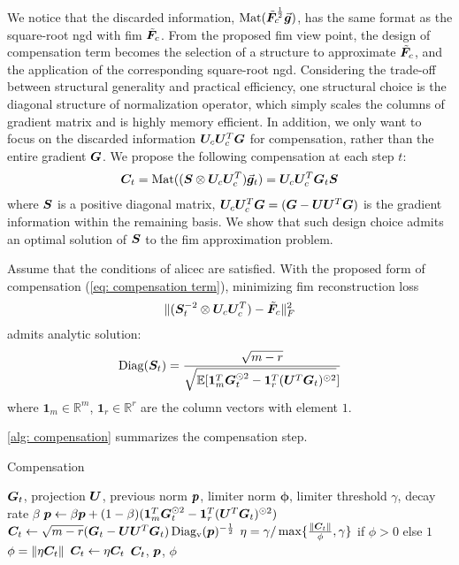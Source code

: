 We notice that the discarded information, $\operatorname{Mat}(\tilde{\bm{F}}_c^{\frac{1}{2}}\vec{\bm{g}})$, has the same format as the square-root \gls{ngd} with \gls{fim} $\tilde{\bm{F}}_c$. From the proposed \gls{fim} view point, the design of compensation term becomes the selection of a structure to approximate $\tilde{\bm{F}}_c$, and the application of the corresponding square-root \gls{ngd}. Considering the trade-off between structural generality and practical efficiency, one structural choice is the diagonal structure of normalization operator, which simply scales the columns of gradient matrix and is highly memory efficient. In addition, we only want to focus on the discarded information ${\bm{U}}_c{\bm{U}}_c^T{\bm{G}}$ for compensation, rather than the entire gradient ${\bm{G}}$. We propose the following compensation at each step $t$:
\begin{align}
    {\bm{C}}_t= \operatorname{Mat}(({\bm{S}}\otimes{\bm{U}}_c{\bm{U}}_c^T)\vec{\bm{g}}_t)={\bm{U}}_c{\bm{U}}_c^T{\bm{G}}_t{\bm{S}}
    \label{eq: compensation term}
\end{align}
where ${\bm{S}}$ is a positive diagonal matrix, ${\bm{U}}_c{\bm{U}}_c^T{\bm{G}}=({\bm{G}}-{\bm{U}}{\bm{U}}^T{\bm{G}})$ is the gradient information within the remaining basis. We show that such design choice admits an optimal solution of ${\bm{S}}$ to the \gls{fim} approximation problem.
\begin{theorem}
    Assume that the conditions of \gls{alicec} are satisfied. With the proposed form of compensation (\cref{eq: compensation term}), minimizing \gls{fim} reconstruction loss
    \begin{align*}
        \Vert({\bm{S}}_t^{-2}\otimes {\bm{U}}_c{\bm{U}}_c^T)-\tilde{\bm{F}}_{c}\Vert_F^2
    \end{align*}
    admits analytic solution:
    \begin{equation}
        \operatorname{Diag}({\bm{S}}_t) = \frac{\sqrt{m-r}}{\sqrt{\mathbb{E}[\bm{1}_m^T{\bm{G}}_t^{\odot 2}-\bm{1}_r^T({\bm{U}}^T{\bm{G}}_t)^{\odot 2}}]}
         \label{eq: optimal D for compensation}
    \end{equation}
    where $\bm{1}_m\in\mathbb{R}^m$, $\bm{1}_r\in\mathbb{R}^r$ are the column vectors with element $1$.
    \label{thm: optimal compensation}
\end{theorem}
\cref{alg: compensation} summarizes the compensation step.

\begin{algorithm}
    \caption{Compensation}
    \label{alg: compensation}
    \begin{algorithmic}[1]
         ${\bm{G}}_t$, projection ${\bm{U}}$, previous norm ${\bm{p}}$, limiter norm $\bm{\phi}$, limiter threshold $\gamma$, decay rate $\beta$
        \STATE ${\bm{p}} \leftarrow \beta{\bm{p}}+(1-\beta)(\bm{1}_m^T{\bm{G}}_t^{\odot 2}-\bm{1}_r^T({\bm{U}}^T{\bm{G}}_t)^{\odot 2})$
        \STATE ${\bm{C}}_t\leftarrow\sqrt{m-r}({\bm{G}}_t-{\bm{U}}{\bm{U}}^T{\bm{G}}_t)\operatorname{Diag_v}({\bm{p}})^{-\frac{1}{2}}$
        \STATE $\eta=\gamma\slash \max\{\frac{\Vert{\bm{C}}_t\Vert}{\phi},\gamma\}$ if $\phi>0$ else $1$        
        \STATE $\phi = \Vert\eta{\bm{C}}_t\Vert$      
        \STATE ${\bm{C}}_t\leftarrow \eta {\bm{C}}_t$
         ${\bm{C}}_t$, ${\bm{p}}$, $\phi$
    \end{algorithmic}
\end{algorithm}



